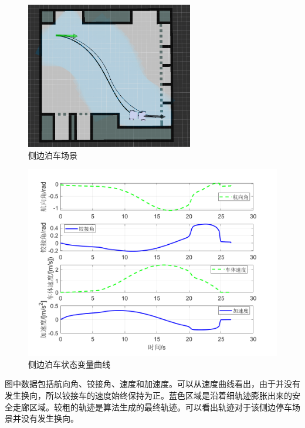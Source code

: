 \documentclass[master,academic]{ysuthesis} %
\begin{document}
		\begin{figure}[H]
			\centering
			\includegraphics[width=0.65\textwidth]{cebianboche.png}
			\caption{侧边泊车场景}
			\label{fig:cebianboche}
		\end{figure}

		\begin{figure}[H]
			\centering
			\includegraphics[width=1\textwidth]{datacebianstate.png}
			\caption{侧边泊车状态变量曲线}
			\label{fig:datacebianstate}
		\end{figure}

		图中数据包括航向角、铰接角、速度和加速度。可以从速度曲线看出，由于并没有发生换向，所以铰接车的速度始终保持为正。蓝色区域是沿着细轨迹膨胀出来的安全走廊区域。较粗的轨迹是算法生成的最终轨迹。可以看出轨迹对于该侧边停车场景并没有发生换向。
\end{document}
